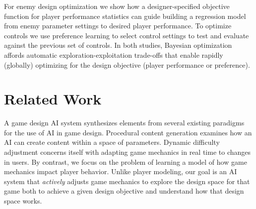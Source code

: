 \documentclass{sig-alternate}
\begin{document}
\noindent
For enemy design optimization we show how a designer-specified objective function for player performance statistics can guide building a regression model from enemy parameter settings to desired player performance. To optimize controls we use preference learning to select control settings to test and evaluate against the previous set of controls. 
In both studies, Bayesian optimization affords automatic exploration-exploitation trade-offs that enable rapidly (globally) optimizing for the design objective (player performance or preference).




\section{Related Work}

A game design AI system synthesizes elements from several existing paradigms for the use of AI in game design. Procedural content generation examines how an AI can create content within a space of parameters.  Dynamic difficulty adjustment concerns itself with adapting game mechanics in real time to changes in users. By contrast, we focus on the problem of learning a model of how game mechanics impact player behavior. 
Unlike player modeling, our goal is an AI system that {\em actively} adjusts game mechanics to explore the design space for that game both to achieve a given design objective and understand how that design space works. 
\end{document}
